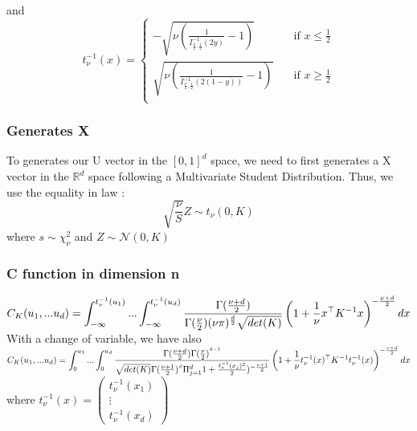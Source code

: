 \documentclass{article}
\begin{document}
  	and \newline
  	\[
   		t_\nu^{-1} (x) =  \begin{cases}
        -\sqrt{\nu (\frac{1}{I^{-1}_{\frac{\nu}{2},\frac{1}{2}}(2y)}-1)}  & \quad \text{if } x \leq \frac{1}{2} \\
    	\sqrt{\nu (\frac{1}{I^{-1}_{\frac{\nu}{2},\frac{1}{2}}(2(1-y))}-1)}  & \quad \text{if } x \geq \frac{1}{2}\\
  	\end{cases}
  	\]

	\subsubsection{Generates X}
	To generates our U vector in the $[0,1]^d$ space, we need to first generates a X vector in the $\mathbb{R}^d$ space following a Multivariate Student Distribution. Thus, we use the equality in law :
	\begin{equation*}
	\sqrt{\frac{\nu}{S}} Z \sim t_\nu (0,K)
	\end{equation*}
	where $s \sim \chi_\nu^2$ and $Z \sim \mathcal{N} (0,K)$

	\subsubsection{C function in dimension n}


	\begin{math}
	 C_{K}(u_{1},...u_{d})= \mathlarger{ \int_{-\infty}^{t_\nu^{-1}(u_{1})}...\int_{-\infty}^{t_\nu^{-1}(u_{d})} \frac{\Gamma (\frac{\nu +d}{2})}{\Gamma
	 (\frac{\nu}{2})(\nu \pi)^{\frac{d}{2}}\sqrt{det(K)}}\left(1+\frac{1}{\nu}x^\top K^{-1} x \right)^{-\frac{\nu +d}{2}}dx}
	\end{math}
	\newline
	\newline
	With a change of variable, we have also \newline
	\newline
	\begin{math}
	C_{K}(u_{1},...u_{d})=  \mathlarger{ \int_{0}^{u_{1}}...\int_{0}^{u_{d}} \frac{\Gamma (\frac{\nu +d}{2}) \Gamma (\frac{\nu}{2})^{^{d-1}}}{\sqrt{det(K)}\Gamma (\frac{\nu +1}{2})^{^{d}}\Pi_{j=1}^d 1+\frac{t_\nu^{-1}(x_j)^2}{2})^{-\frac{\nu+1}{2}}}\left(1+\frac{1}{\nu}t_\nu^{-1}(x)^\top K^{-1} t_\nu^{-1}(x) \right)^{-\frac{\nu +d}{2}}dx}
	\end{math}
	\newline
	\newline
	\newline
	where \begin{math} t_\nu^{-1}(x) =  \begin{pmatrix}
   t_\nu^{-1}(x_{1}) \\
  \vdots   \\
   t_\nu^{-1}(x_{d})
 \end{pmatrix}\end{math}
\end{document}
